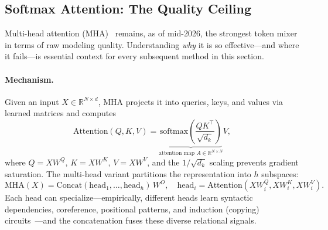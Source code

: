 \documentclass[11pt,a4paper]{article}
\begin{document}
\subsection{Softmax Attention: The Quality Ceiling}
\label{subsec:mha}

Multi-head attention (MHA)~\cite{vaswani2017attention} remains, as of mid-2026, the strongest token mixer in terms of raw modeling quality. Understanding \emph{why} it is so effective---and where it fails---is essential context for every subsequent method in this section.

\paragraph{Mechanism.}
Given an input $X \in \mathbb{R}^{N \times d}$, MHA projects it into queries, keys, and values via learned matrices and computes
\begin{equation}
\text{Attention}(Q, K, V) = \underbrace{\text{softmax}\!\left(\frac{QK^\top}{\sqrt{d_k}}\right)}_{\text{attention map } A \in \mathbb{R}^{N \times N}} V,
\label{eq:mha}
\end{equation}
where $Q = XW^Q$, $K = XW^K$, $V = XW^V$, and the $1/\sqrt{d_k}$ scaling prevents gradient saturation. The multi-head variant partitions the representation into $h$ subspaces:
\begin{equation}
\text{MHA}(X) = \text{Concat}(\text{head}_1, \ldots, \text{head}_h)\, W^O, \quad \text{head}_i = \text{Attention}(XW_i^Q, XW_i^K, XW_i^V).
\end{equation}
Each head can specialize---empirically, different heads learn syntactic dependencies, coreference, positional patterns, and induction (copying) circuits~\cite{olsson2022context}---and the concatenation fuses these diverse relational signals.
\end{document}
